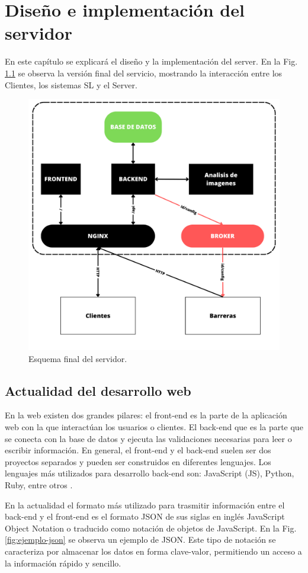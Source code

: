 \chapter{Diseño e implementación del servidor}

En este capítulo se explicará el diseño y la implementación del server. En la Fig. \ref{fig:server-final} se observa la versión final del servicio, mostrando la interacción entre los Clientes, los sistemas SL y el Server.

\begin{figure}[bth]
    \centering
    \includegraphics[width=.6\textwidth]{imgs/server-esquema.png}
    \caption{Esquema final del servidor.}
    \label{fig:server-final}
\end{figure}

\section{Actualidad del desarrollo web}

En la web existen dos grandes pilares: el front-end es la parte de la aplicación web con la que interactúan los usuarios o clientes. El back-end que es la parte que se conecta con la base de datos y ejecuta las validaciones necesarias para leer o escribir información. En general, el front-end y el back-end suelen ser dos proyectos separados y pueden ser construidos en diferentes lenguajes. Los lenguajes más utilizados para desarrollo back-end son: JavaScript (JS), Python, Ruby, entre otros \cite{presta_10_2021}.

En la actualidad el formato más utilizado para trasmitir información entre el back-end y el front-end es el formato JSON de sus siglas en inglés JavaScript Object Notation o traducido como notación de objetos de JavaScript. En la Fig. \ref{fig:ejemplo-json} se observa un ejemplo de JSON. Este tipo de notación se caracteriza por almacenar los datos en forma clave-valor, permitiendo un acceso a la información rápido y sencillo.

